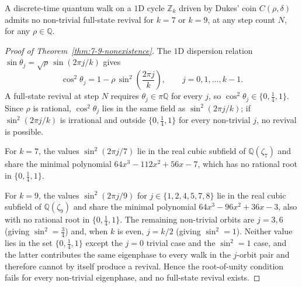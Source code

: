 \begin{theorem}[Non-existence for $k = 7$ and $k = 9$]
\label{thm:7-9-nonexistence}
A discrete-time quantum walk on a $1$D cycle $\mathbb{Z}_k$ driven
by Dukes' coin $C(\rho, \delta)$ admits no non-trivial full-state
revival for $k = 7$ or $k = 9$, at any step count $N$, for any
$\rho \in \mathbb{Q}$.
\end{theorem}

\begin{proof}[Proof of Theorem~\ref{thm:7-9-nonexistence}]
The $1$D dispersion relation
$\sin\theta_j = \sqrt{\rho}\,\sin(2\pi j/k)$ gives
\[
\cos^2\theta_j
= 1 - \rho\,\sin^2\!\left(\frac{2\pi j}{k}\right),
\qquad j = 0, 1, \ldots, k-1 .
\]
A full-state revival at step $N$ requires
$\theta_j \in \pi\mathbb{Q}$ for every $j$, so
$\cos^2\theta_j \in \{0, \tfrac{1}{4}, 1\}$. Since $\rho$ is
rational, $\cos^2\theta_j$ lies in the same field as
$\sin^2(2\pi j/k)$; if $\sin^2(2\pi j/k)$ is irrational and outside
$\{0, \tfrac{1}{4}, 1\}$ for every non-trivial $j$, no revival is
possible.

For $k = 7$, the values $\sin^2(2\pi j/7)$ lie in the real cubic
subfield of $\mathbb{Q}(\zeta_7)$ and share the minimal polynomial
$64 x^3 - 112 x^2 + 56 x - 7$, which has no rational root in
$\{0, \tfrac{1}{4}, 1\}$.

For $k = 9$, the values $\sin^2(2\pi j/9)$ for
$j \in \{1, 2, 4, 5, 7, 8\}$ lie in the real cubic subfield of
$\mathbb{Q}(\zeta_9)$ and share the minimal polynomial
$64 x^3 - 96 x^2 + 36 x - 3$, also with no rational root in
$\{0, \tfrac{1}{4}, 1\}$. The remaining non-trivial orbits are
$j = 3, 6$ (giving $\sin^2 = \tfrac{3}{4}$) and, when $k$ is even,
$j = k/2$ (giving $\sin^2 = 1$). Neither value lies in the set
$\{0, \tfrac{1}{4}, 1\}$ except the $j = 0$ trivial case and the
$\sin^2 = 1$ case, and the latter contributes the same eigenphase
to every walk in the $j$-orbit pair and therefore cannot by itself
produce a revival. Hence the root-of-unity condition fails for
every non-trivial eigenphase, and no full-state revival exists.
\end{proof}
